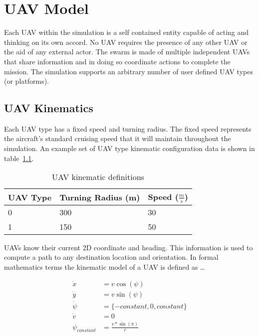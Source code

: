 \chapter{UAV Model}
Each UAV within the simulation is a self contained entity capable of acting and thinking on its own accord.  No UAV requires the presence of any other UAV or the aid of any external actor.  The swarm is made of multiple independent UAVs that share information and in doing so coordinate actions to complete the mission.  The simulation supports an arbitrary number of user defined UAV types (or platforms).


\section{UAV Kinematics}
Each UAV type has a fixed speed and turning radius.  The fixed speed represents the aircraft's standard cruising speed that it will maintain throughout the simulation.  An example set of UAV type kinematic configuration data is shown in table~\ref{tab:uavKinematic}.

\begin{table}[h]
	\caption{UAV kinematic definitions}
	\centering
	\label{tab:uavKinematic}
	\begin{tabular}{|p{1cm}|p{2cm}|p{1cm}|}
		\hline
		UAV Type & Turning Radius (m) & Speed ($\frac{m}{s}$)\\ \hline
		0 & 300 & 30 \\
		1 & 150 & 50 \\
		\hline
	\end{tabular}
\end{table}

UAVs know their current 2D coordinate and heading.  This information is used to compute a path to any destination location and orientation.  In formal mathematics terms the kinematic model of a UAV is defined as \dots

\begin{align}
\dot{x} &= v \cos(\psi) \label{eq:uavChngX}\\
\dot{y} &= v \sin(\psi) \label{eq:uavChngY}\\
\dot{\psi} &= \{-constant, 0, constant\} \label{eq:uavTurnRate}\\
\dot{v} &= 0 \label{eq:uavAccel}\\
\psi_{constant} &= \frac{v*\sin(\pi)}{r} \label{eq:uavTurnRateDeriv}
\end{align}

